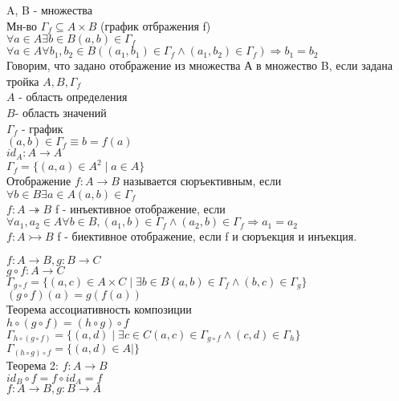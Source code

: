 A, B - множества \\
Мн-во $ \varGamma_f \subseteq A \times B $ (график отбражения f) \\
$ \forall a \in A \exists b \in B (a, b) \in \varGamma_f $\\
$ \forall a \in A \forall b_1, b_2 \in B ((a_1, b_1) \in \varGamma_f \wedge (a_1, b_2) \in \varGamma_f) \Rightarrow b_1 = b_2  $ \\
Говорим, что задано отображение из множества А в множество B, если задана тройка $ A, B, \varGamma_f $ \\
$A$ - область определения \\
$B $- область значений \\
$\varGamma_f$ - график \\
$ (a, b) \in \varGamma_f \equiv b = f(a) $ \\
$ id_A : A \rightarrow A $ \\
$ \varGamma_f = \{ (a, a) \in A^2 \mid a \in A \} $\\
Отображение $ f: A \rightarrow B $ называется сюръективным, если $ \forall b \in B \exists a \in A (a, b) \in \varGamma_f $\\
$ f: A \twoheadrightarrow B $
f - инъективное отображение, если $ \forall a_1, a_2 \in A \forall b \in B, (a_1, b) \in \varGamma_f \wedge (a_2, b) \in \varGamma_f \Rightarrow a_1 = a_2 $ \\
$ f: A \rightarrowtail B $
f - биективное отображение, если f и сюръекция и инъекция. \\


$ f: A \rightarrow B, g: B \rightarrow C $ \\
$ g \circ f : A \rightarrow C $ \\
$ \varGamma_{g \circ f} = \{ (a, c) \in A \times C \mid \exists b \in B (a, b) \in \varGamma_f \wedge (b, c) \in \varGamma_g \} $ \\
$ (g \circ f)(a)= g(f(a)) $ \\
Теорема ассоциативность композиции\\
$ h \circ (g \circ f) = (h \circ g) \circ f $ \\
$ \varGamma_{h \circ (g \circ f)} = \{ (a, d) \mid \exists c \in C (a, c) \in \varGamma_{g \circ f} \wedge (c, d) \in \varGamma_{h} \} $\\
$ \varGamma_{(h \circ g) \circ f} = \{ (a, d) \in A \mid  \} $ \\
Теорема 2: $ f: A \rightarrow B $ \\
$ id_B \circ f = f \circ id_A  = f $ \\
$ f : A \rightarrow B, g: B \rightarrow A $ \\

